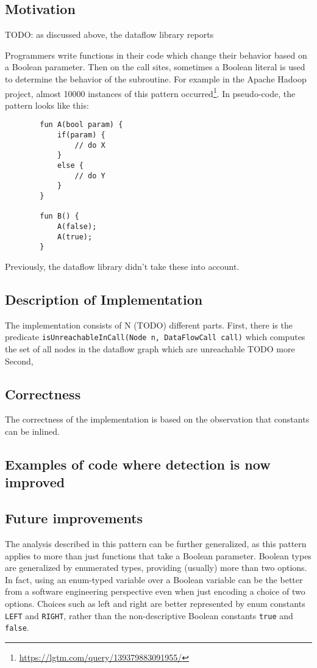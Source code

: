 \subsection{Motivation}
TODO: as discussed above, the dataflow library reports 

Programmers write functions in their code which change their behavior based on 
a Boolean parameter.
Then on the call sites, sometimes a Boolean literal is used to determine the behavior
of the subroutine.
For example in the Apache Hadoop project, almost 10000 instances of this
pattern occurred\footnote{\url{https://lgtm.com/query/139379883091955/}}.
In pseudo-code, the pattern looks like this:
\begin{verbatim}
        fun A(bool param) {
            if(param) {
                // do X
            }
            else {
                // do Y
            }
        }

        fun B() {
            A(false);
            A(true);
        }
\end{verbatim}
Previously, the dataflow library didn't take these into account.


\subsection{Description of Implementation}
The implementation consists of N (TODO) different parts.
First, there is the predicate \texttt{isUnreachableInCall(Node n, DataFlowCall call)} which
computes the set of all nodes in the dataflow graph which are unreachable
TODO more
Second, 
\subsection{Correctness}
The correctness of the implementation is based on the observation that constants can be
inlined.

\subsection{Examples of code where detection is now improved}
\subsection{Future improvements}
The analysis described in this pattern can be further generalized, as
this pattern applies to more than just functions that take a Boolean parameter.
Boolean types are generalized by enumerated types, providing (usually) more than two options.
In fact, using an enum-typed variable over a Boolean variable can be the better from a software engineering perspective
even when just encoding a choice of two options.
Choices such as left and right are better represented 
by enum constants \texttt{LEFT} and \texttt{RIGHT}, rather than the 
non-descriptive Boolean constants \texttt{true} and \texttt{false}.

